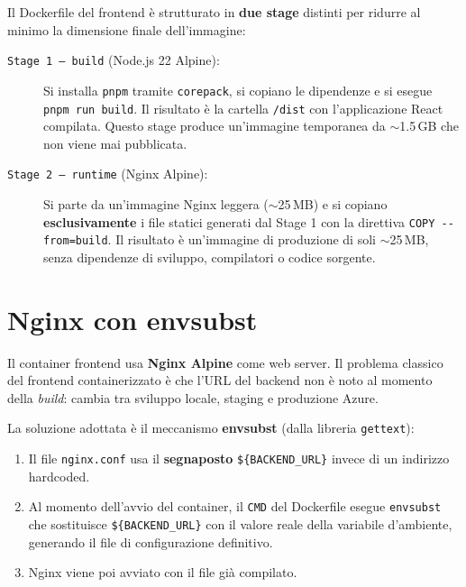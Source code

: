 \documentclass[12pt,a4paper,oneside]{report}
\begin{document}
Il Dockerfile del frontend \`{e} strutturato in \textbf{due stage} distinti per ridurre
al minimo la dimensione finale dell'immagine:

\begin{description}
    \item[\texttt{Stage 1 --- build} (Node.js 22 Alpine):] Si installa \texttt{pnpm}
          tramite \texttt{corepack}, si copiano le dipendenze e si esegue \texttt{pnpm run build}.
          Il risultato \`{e} la cartella \texttt{/dist} con l'applicazione React compilata.
          Questo stage produce un'immagine temporanea da $\sim$1.5\,GB che non
          viene mai pubblicata.
    \item[\texttt{Stage 2 --- runtime} (Nginx Alpine):] Si parte da un'immagine
          Nginx leggera ($\sim$25\,MB) e si copiano \textbf{esclusivamente} i file
          statici generati dal Stage 1 con la direttiva \texttt{COPY -{}-from=build}.
          Il risultato \`{e} un'immagine di produzione di soli $\sim$25\,MB, senza
          dipendenze di sviluppo, compilatori o codice sorgente.
\end{description}

\section{Nginx con envsubst}

Il container frontend usa \textbf{Nginx Alpine} come web server. Il problema classico
del frontend containerizzato \`{e} che l'URL del backend non \`{e} noto al momento della
\textit{build}: cambia tra sviluppo locale, staging e produzione Azure.

La soluzione adottata \`{e} il meccanismo \textbf{envsubst} (dalla libreria \texttt{gettext}):
\begin{enumerate}
    \item Il file \texttt{nginx.conf} usa il \textbf{segnaposto} \texttt{\$\{BACKEND\_URL\}}
          invece di un indirizzo hardcoded.
    \item Al momento dell'avvio del container, il \texttt{CMD} del Dockerfile
          esegue \texttt{envsubst} che sostituisce \texttt{\$\{BACKEND\_URL\}} con il valore
          reale della variabile d'ambiente, generando il file di configurazione definitivo.
    \item Nginx viene poi avviato con il file gi\`{a} compilato.
\end{enumerate}
\end{document}
